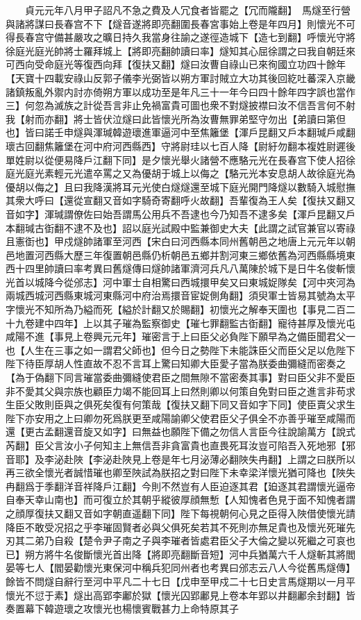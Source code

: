 　　貞元元年八月甲子詔凡不急之費及人冗食者皆罷之【冗而隴翻】　馬燧至行營與諸將謀曰長春宫不下【燧音遂將即亮翻圍長春宮事始上卷是年四月】則懷光不可得長春宫守備甚嚴攻之曠日持久我當身往諭之遂徑造城下【造七到翻】呼懷光守將徐庭光庭光帥將士羅拜城上【將即亮翻帥讀曰率】燧知其心屈徐謂之曰我自朝廷來可西向受命庭光等復西向拜【復扶又翻】燧曰汝曹自祿山已來徇國立功四十餘年【天寶十四載安祿山反郭子儀李光弼皆以朔方軍討賊立大功其後回紇吐蕃深入京畿諸鎮叛亂外禦内討亦倚朔方軍以成功至是年凡三十一年今曰四十餘年四字誤也當作三】何忽為滅族之計從吾言非止免禍富貴可圖也衆不對燧披襟曰汝不信吾言何不射我【射而亦翻】將士皆伏泣燧曰此皆懷光所為汝曹無罪弟堅守勿出【弟讀曰第但也】皆曰諾壬申燧與渾瑊韓遊瓌進軍逼河中至焦籬堡【渾戶昆翻又戶本翻瑊戶咸翻瓌古回翻焦籬堡在河中府河西縣西】守將尉珪以七百人降【尉紆勿翻本複姓尉遲後單姓尉以從便易降戶江翻下同】是夕懷光舉火諸營不應駱元光在長春宫下使人招徐庭光庭光素輕元光遣卒罵之又為優胡于城上以侮之【駱元光本安息胡人故徐庭光為優胡以侮之】且曰我降漢將耳元光使白燧燧還至城下庭光開門降燧以數騎入城慰撫其衆大呼曰【還從宣翻又音如字騎奇寄翻呼火故翻】吾輩復為王人矣【復扶又翻又音如字】渾瑊謂僚佐曰始吾謂馬公用兵不吾逮也今乃知吾不逮多矣【渾戶昆翻又戶本翻瑊古衘翻不逮不及也】詔以庭光試殿中監兼御史大夫【此謂之試官兼官以寄祿且憲衘也】甲戍燧帥諸軍至河西【宋白曰河西縣本同州舊朝邑之地唐上元元年以朝邑地置河西縣大歷三年復置朝邑縣仍析朝邑五鄉并割河東三鄉依舊為河西縣縣境東西十四里帥讀曰率考異曰舊燧傳曰燧帥諸軍濟河兵凡八萬陳於城下是日牛名俊斬懷光首以城降今從邠志】河中軍士自相驚曰西城擐甲矣又曰東城娖隊矣【河中夾河為兩城西城河西縣東城河東縣河中府治焉擐音宦娖側角翻】須臾軍士皆易其號為太平字懷光不知所為乃縊而死【縊於計翻又於賜翻】初懷光之解奉天圍也【事見二百二十九卷建中四年】上以其子璀為監察御史【璀七罪翻監古衘翻】寵待甚厚及懷光屯咸陽不進【事見上卷興元元年】璀密言于上曰臣父必負陛下願早為之備臣聞君父一也【人生在三事之如一謂君父師也】但今日之勢陛下未能誅臣父而臣父足以危陛下陛下待臣厚胡人性直故不忍不言耳上驚曰知卿大臣愛子當為朕委曲彌縫而密奏之【為于偽翻下同言璀當委曲彌縫使君臣之間無隙不當密奏其事】對曰臣父非不愛臣非不愛其父與宗族也顧臣力竭不能回耳上曰然則卿以何策自免對曰臣之進言非苟求生臣父敗則臣與之俱死矣復有何策哉【復扶又翻下同又音如字下同】使臣賣父求生陛下亦安用之上曰卿勿死爲朕更至咸陽諭卿父使君臣父子俱全不亦善乎璀至咸陽而還【更古孟翻還音旋又如字】曰無益也願陛下備之勿信人言臣今往說諭萬方【說式芮翻】臣父言汝小子何知主上無信吾非貪富貴也直畏死耳汝豈可陷吾入死地邪【邪音耶】及李泌赴陜【李泌赴陜見上卷是年七月泌薄必翻陜失冉翻】上謂之曰朕所以再三欲全懷光者誠惜璀也卿至陜試為朕招之對曰陛下未幸梁洋懷光猶可降也【陜失冉翻爲于季翻洋音祥降戶江翻】今則不然豈有人臣迫逐其君【廹逐其君謂懷光逼帝自奉天幸山南也】而可復立於其朝乎縱彼厚顔無慙【人知愧者色見于面不知愧者謂之顔厚復扶又翻又音如字朝直遥翻下同】陛下每視朝何心見之臣得入陜借使懷光請降臣不敢受况招之乎李璀固賢者必與父俱死矣若其不死則亦無足貴也及懷光死璀先刃其二弟乃自殺【楚令尹子南之子與李璀者皆處君臣父子大倫之變以死繼之可哀也已】朔方將牛名俊斷懷光首出降【將即亮翻斷音短】河中兵猶萬六千人燧斬其將閻晏等七人【閻晏勸懷光東保河中稱兵犯同州者也考異曰邠志云八人今從舊馬燧傳】餘皆不問燧自辭行至河中平凡二十七日【戊申至甲戍二十七日史言馬燧期以一月平懷光不愆于素】燧出高郢李鄘於獄【懷光囚郢鄘見上卷本年郢以井翻鄘余封翻】皆奏置幕下韓遊瓌之攻懷光也楊懷賓戰甚力上命特原其子